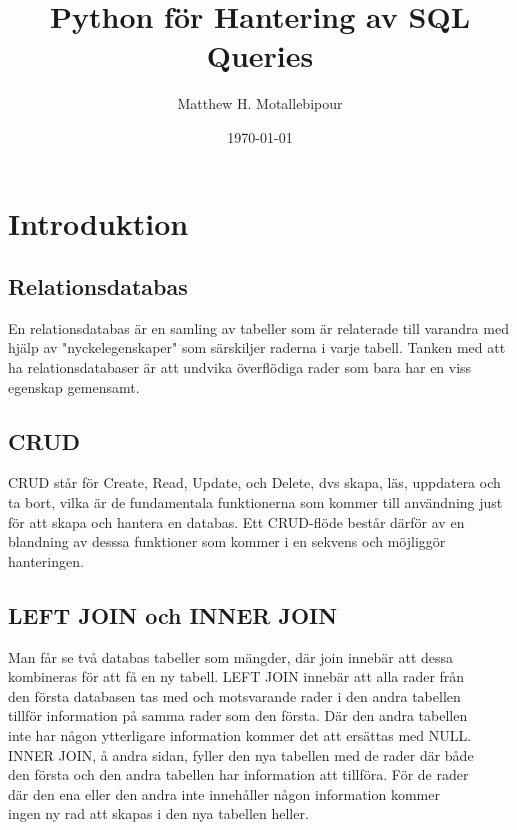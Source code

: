 \documentclass[]{article}
\begin{document}

\title{Python för Hantering av SQL Queries}
\author{Matthew H. Motallebipour}
\date{\today}
\maketitle

\section{Introduktion}


\subsection{Relationsdatabas}

En relationsdatabas är en samling av tabeller som är relaterade till varandra med hjälp av "nyckelegenskaper" som särskiljer raderna i varje tabell. Tanken med att ha relationsdatabaser är att undvika överflödiga rader som bara har en viss egenskap gemensamt.


\subsection{CRUD}

CRUD står för Create, Read, Update, och Delete, dvs skapa, läs, uppdatera och ta bort, vilka är de fundamentala funktionerna som kommer till användning just för att skapa och hantera en databas. Ett CRUD-flöde består därför av en blandning av desssa funktioner som kommer i en sekvens och möjliggör hanteringen.



\subsection{LEFT JOIN och INNER JOIN}


Man får se två databas tabeller som mängder, där join innebär att dessa \\
kombineras för att få en ny tabell. LEFT JOIN innebär att alla rader från \\
den första databasen tas med och motsvarande rader i den andra tabellen \\
tillför information på samma rader som den första. Där den andra tabellen \\
inte har någon ytterligare information kommer det att ersättas med NULL. \\
INNER JOIN, å andra sidan, fyller den nya tabellen med de rader där både \\
den första och den andra tabellen har information att tillföra. För de rader \\
där den ena eller den andra inte innehåller någon information kommer \\
ingen ny rad att skapas i den nya tabellen heller.
\end{document}
